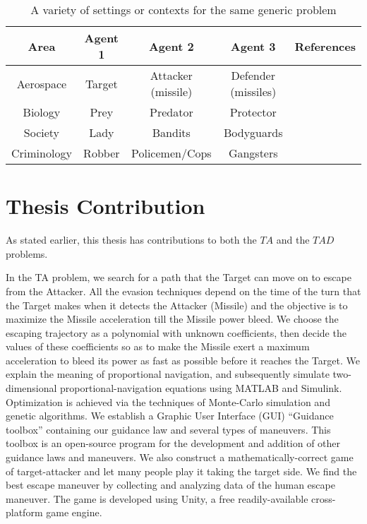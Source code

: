 \begin{table}
	\caption{A variety of settings or contexts for the same generic problem}
\begin{tabular}{ |c||c|c|c|c| } 
\hline
Area & Agent 1 & Agent 2 & Agent 3 & References \\
 \hline
 \hline
 Aerospace & Target & Attacker (missile) & Defender (missiles) & \cite{pachter2014active,garcia2015active,garcia2015escape,garcia2014cooperative,garcia2015cooperative}\\
 \hline 
 Biology & Prey & Predator & Protector & \cite{de2010analysis,oyler2014pursuit}\\
 \hline 
 Society & Lady & Bandits & Bodyguards & \cite{rusnak2005lady}\\ 
 \hline
 Criminology & Robber & Policemen/Cops & Gangsters & \cite{cheung2007pursuit}\\ 
  \hline
\end{tabular}

\label{tableTAD}
\end{table}  

\section{Thesis Contribution}
As stated earlier, this thesis has contributions to both the $ TA $ and the $ TAD $ problems.

In the TA problem, we search for a path that the Target can move on to escape from the Attacker. All the evasion techniques depend on the time of the turn that the Target makes when it detects the Attacker (Missile) and the objective is to maximize the Missile acceleration till the Missile power bleed. We choose the escaping trajectory as a polynomial with unknown coefficients, then decide the values of these coefficients so as to make the Missile exert a maximum acceleration to bleed its power as fast as possible before it reaches the Target. We explain the meaning of proportional navigation, and subsequently simulate two- dimensional proportional-navigation equations using MATLAB and Simulink. Optimization is achieved via the techniques of Monte-Carlo simulation and genetic algorithms. We establish a Graphic User Interface (GUI) “Guidance toolbox” containing our guidance law and several types of maneuvers. This toolbox is an open-source program for the development and addition of other guidance laws and maneuvers. We also construct a mathematically-correct game of target-attacker and let many people play it taking the target side. We find the best escape maneuver by collecting and analyzing data of the human escape maneuver. The game is developed using Unity, a free readily-available cross-platform game engine.

